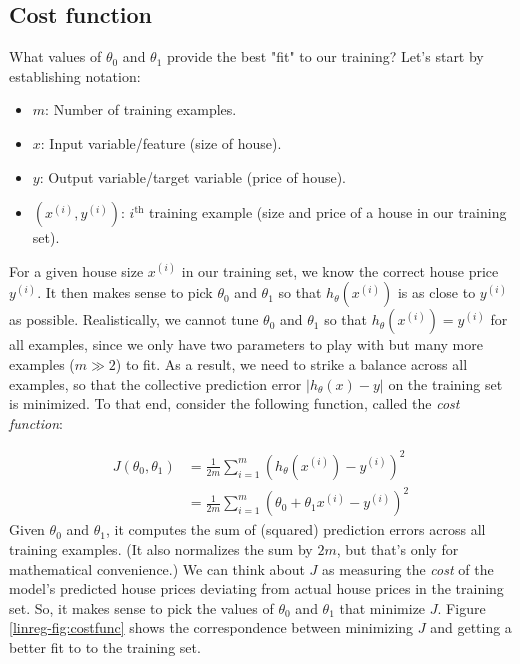 \documentclass{article}
\theoremstyle{definition}
\begin{document}
\subsection{Cost function}
What values of $\theta_0$ and $\theta_1$ provide the best "fit" to our training? Let's start by establishing notation:
\begin{itemize}
    \item $m$: Number of training examples.
    \item $x$: Input variable/feature (size of house).
    \item $y$: Output variable/target variable (price of house).
    \item $(x^{(i)}, y^{(i)})$: $i^{\text{th}}$ training example (size and price of a house in our training set).
\end{itemize}

For a given house size $x^{(i)}$ in our training set, we know the correct house price $y^{(i)}$. It then makes sense to pick $\theta_0$ and $\theta_1$ so that $h_{\theta}(x^{(i)})$ is as close to $y^{(i)}$ as possible. Realistically, we cannot tune $\theta_0$ and $\theta_1$ so that $h_{\theta}(x^{(i)})=y^{(i)}$ for all examples, since we only have two parameters to play with but many more examples ($m \gg 2$) to fit. As a result, we need to strike a balance across all examples, so that the collective prediction error $|h_{\theta}(x) - y|$ on the training set is minimized. To that end, consider the following function, called the \textit{cost function}:

\begin{align}
    J(\theta_0, \theta_1) &= \frac{1}{2m}\sum_{i=1}^{m}(h_{\theta}(x^{(i)}) - y^{(i)})^2
    \label{linreg-eq:costfunc}\\
    &= \frac{1}{2m}\sum_{i=1}^{m}(\theta_0 + \theta_1 x^{(i)} - y^{(i)})^2
    \label{linreg-eq:univar-costfunc}
\end{align}
Given $\theta_0$ and $\theta_1$, it computes the sum of (squared) prediction errors across all training examples. (It also normalizes the sum by $2m$, but that's only for mathematical convenience.) We can think about $J$ as measuring the \textit{cost} of the model's predicted house prices deviating from actual house prices in the training set. So, it makes sense to pick the values of $\theta_0$ and $\theta_1$ that minimize $J$. Figure \ref{linreg-fig:costfunc} shows the correspondence between minimizing $J$ and getting a better fit to to the training set. 
\end{document}
